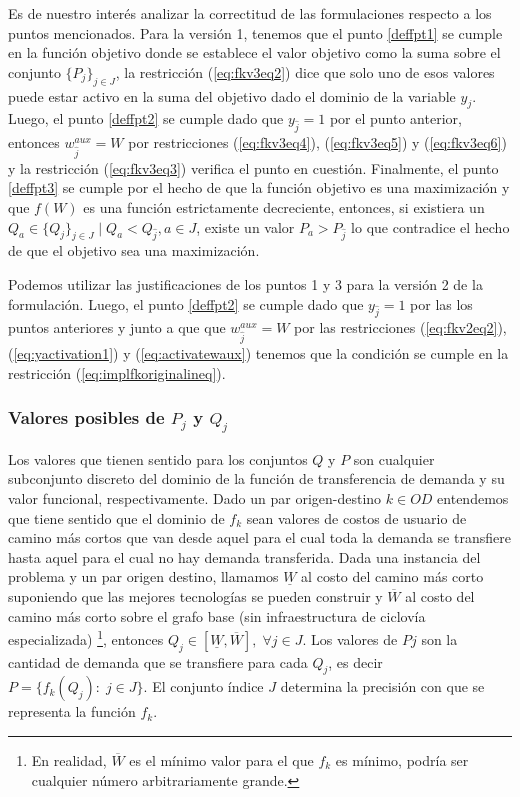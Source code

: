 \documentclass{article}
\begin{document}
  Es de nuestro interés analizar la correctitud de las formulaciones respecto a los puntos mencionados. Para la versión 1, tenemos que el punto \ref{deffpt1} se cumple en la función objetivo donde se establece el valor objetivo como la suma sobre el conjunto $\{P_j\}_{j \in J}$, la restricción (\ref{eq:fkv3eq2}) dice que solo uno de esos valores puede estar activo en la suma del objetivo dado el dominio de la variable $y_j$. Luego, el punto \ref{deffpt2} se cumple dado que $y_{\hat{j}} = 1$ por el punto anterior, entonces $w_{\hat{j}}^{aux} = W$ por restricciones (\ref{eq:fkv3eq4}), (\ref{eq:fkv3eq5}) y (\ref{eq:fkv3eq6}) y la restricción (\ref{eq:fkv3eq3}) verifica el punto en cuestión. Finalmente, el punto \ref{deffpt3} se cumple por el hecho de que la función objetivo es una maximización y que $f(W)$ es una función estrictamente decreciente, entonces, si existiera un $Q_a \in \{Q_j\}_{j \in J} \;|\; Q_a < Q_{\hat{j}}, a \in J$, existe un valor $P_a > P_{\hat{j}}$ lo que contradice el hecho de que el objetivo sea una maximización.

  Podemos utilizar las justificaciones de los puntos 1 y 3 para la versión 2 de la formulación. Luego, el punto \ref{deffpt2} se cumple dado que $y_{\hat{j}} = 1$ por las los puntos anteriores y junto a que que $w^{aux}_{\hat{j}} = W$ por las restricciones (\ref{eq:fkv2eq2}), (\ref{eq:yactivation1}) y (\ref{eq:activatewaux}) tenemos que la condición se cumple en la restricción (\ref{eq:implfkoriginalineq}).

  \subsubsection{Valores posibles de $P_j$ y $Q_j$}

  Los valores que tienen sentido para los conjuntos $Q$ y $P$ son cualquier subconjunto discreto del dominio de la función de transferencia de demanda y su valor funcional, respectivamente. Dado un par origen-destino $k \in OD$ entendemos que tiene sentido que el dominio de $f_k$ sean valores de costos de usuario de camino más cortos que van desde aquel para el cual toda la demanda se transfiere hasta aquel para el cual no hay demanda transferida. Dada una instancia del problema y un par origen destino, llamamos $\underline{W}$ al costo del camino más corto suponiendo que las mejores tecnologías se pueden construir y $\overline{W}$ al costo del camino más corto sobre el grafo base (sin infraestructura de ciclovía especializada) \footnote{En realidad, $\overline{W}$ es el mínimo valor para el que $f_k$ es mínimo, podría ser cualquier número arbitrariamente grande.}, entonces $Q_j \in [\underline{W}, \overline{W}],\; \forall j \in J$. Los valores de $Pj$ son la cantidad de demanda que se transfiere para cada $Q_j$, es decir $P = \{f_k(Q_j):\; j \in J\}$. El conjunto índice $J$ determina la precisión con que se representa la función $f_k$.
\end{document}
